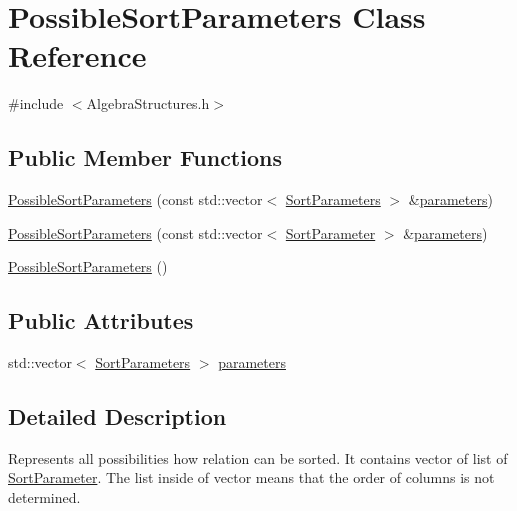 \hypertarget{class_possible_sort_parameters}{\section{Possible\+Sort\+Parameters Class Reference}
\label{class_possible_sort_parameters}
}


{\ttfamily \#include $<$Algebra\+Structures.\+h$>$}

\subsection*{Public Member Functions}
\begin{DoxyCompactItemize}
\item 
\hyperlink{class_possible_sort_parameters_a08aad6763c347ad2a4dc2f20183efc24}{Possible\+Sort\+Parameters} (const std\+::vector$<$ \hyperlink{class_sort_parameters}{Sort\+Parameters} $>$ \&\hyperlink{class_possible_sort_parameters_ac7cd94ff83acacceb9adee62c4228e7f}{parameters})
\item 
\hyperlink{class_possible_sort_parameters_abf5abacee677c21a76de099cac60aa1a}{Possible\+Sort\+Parameters} (const std\+::vector$<$ \hyperlink{class_sort_parameter}{Sort\+Parameter} $>$ \&\hyperlink{class_possible_sort_parameters_ac7cd94ff83acacceb9adee62c4228e7f}{parameters})
\item 
\hyperlink{class_possible_sort_parameters_a0193033d9b018482a26f1501d489f4ba}{Possible\+Sort\+Parameters} ()
\end{DoxyCompactItemize}
\subsection*{Public Attributes}
\begin{DoxyCompactItemize}
\item 
std\+::vector$<$ \hyperlink{class_sort_parameters}{Sort\+Parameters} $>$ \hyperlink{class_possible_sort_parameters_ac7cd94ff83acacceb9adee62c4228e7f}{parameters}
\end{DoxyCompactItemize}


\subsection{Detailed Description}
Represents all possibilities how relation can be sorted. It contains vector of list of \hyperlink{class_sort_parameter}{Sort\+Parameter}. The list inside of vector means that the order of columns is not determined. 

